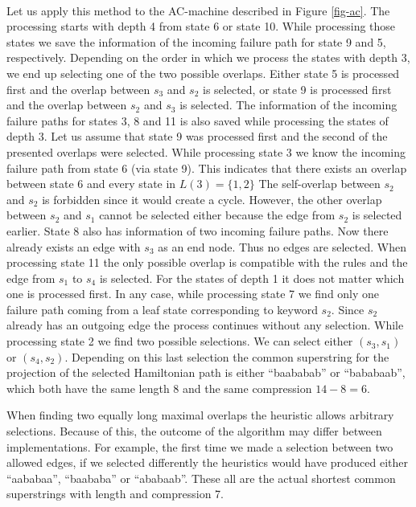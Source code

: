 \documentclass[english,twoside,censored,csm,algorithms-track-2020]{HYthesisML}
\theoremstyle{plain}
\theoremstyle{definition}
\newcounter{testexample}
\numberwithin{testexample}{chapter}
\begin{document}
\begin{testexample}~\label{examplelabeldummy}\\
Let us apply this method to the AC-machine described in Figure \ref{fig-ac}. The processing starts
with depth 4 from state 6 or state 10. While processing those states we save the information of
the incoming failure path for state 9 and 5, respectively. Depending on the order in which we process
the states with depth 3, we end up selecting one of the two possible overlaps. Either state 5
is processed first and the overlap between $s_3$ and $s_2$ is selected, or state 9 is processed
first and the overlap between $s_2$ and $s_3$ is selected. The information of the incoming failure
paths for states 3, 8 and 11 is also saved while processing the states of depth 3. Let us assume
that state 9 was processed first and the second of the presented overlaps were selected.
While processing state 3 we know the incoming failure path from state 6 (via
state 9). This indicates that there exists an overlap between state 6 and every state
in $L(3)=\{1,2\}$ The self-overlap between $s_2$ and $s_2$ is forbidden since it would
create a cycle. However, the other overlap between $s_2$ and $s_1$ cannot be selected either because
the edge from $s_2$ is selected earlier. State 8 also has information of two incoming failure
paths. Now there already exists an edge with $s_3$ as an end node. Thus no edges are selected.
When processing state 11 the only possible overlap is compatible with the rules and the edge
from $s_1$ to $s_4$ is selected. For the states of depth 1 it does not matter which one is processed
first. In any case, while processing state 7 we find only one failure path coming from a leaf state
corresponding to keyword $s_2$. Since $s_2$ already has an outgoing edge the process continues
without any selection. While processing state 2 we find two possible selections. We can select
either $(s_3,s_1)$ or $(s_4,s_2)$. Depending on this last selection the common superstring for
the projection of the selected Hamiltonian path is either ``baababab'' or ``bababaab'', which
both have the same length 8 and the same compression $14-8=6$.

When finding two equally long maximal overlaps the heuristic allows arbitrary selections.
Because of this, the outcome of the algorithm may differ between implementations. For example,
the first time
we made a selection between two allowed edges, if we selected differently the heuristics would
have produced either ``aababaa'', ``baababa'' or ``ababaab''. These all are the actual shortest common
superstrings with length and compression 7.
\end{testexample}
\end{document}
